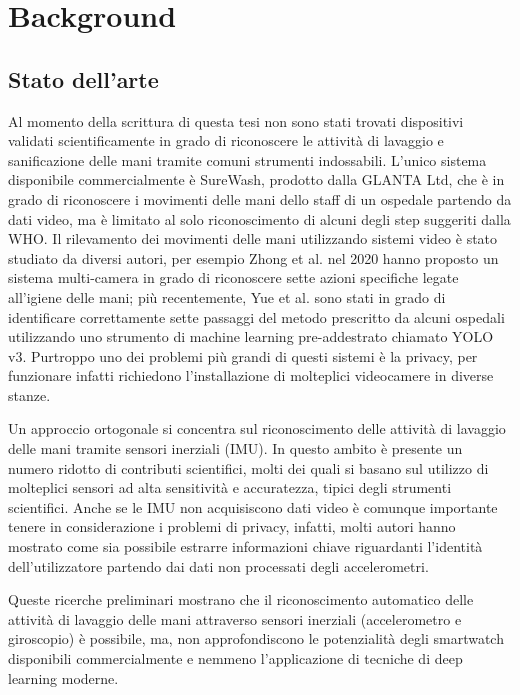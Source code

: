 \chapter{Background}
\label{cap:background}

\section{Stato dell'arte}
\label{sec:stato-dell-arte}

Al momento della scrittura di questa tesi non sono stati trovati dispositivi validati scientificamente in grado di riconoscere le attività di lavaggio e sanificazione delle mani tramite comuni strumenti indossabili. L'unico sistema disponibile commercialmente è SureWash, prodotto dalla GLANTA Ltd, che è in grado di riconoscere i movimenti delle mani dello staff di un ospedale partendo da dati video, ma è limitato al solo riconoscimento di alcuni degli step suggeriti dalla WHO.
Il rilevamento dei movimenti delle mani utilizzando sistemi video è stato studiato da diversi autori, per esempio Zhong et al. nel 2020 hanno proposto un sistema multi-camera in grado di riconoscere sette azioni specifiche legate all'igiene delle mani\cite{zhong2020multi}; più recentemente, Yue et al. sono stati in grado di identificare correttamente sette passaggi del metodo prescritto da alcuni ospedali utilizzando uno strumento di machine learning pre-addestrato chiamato YOLO v3\cite{yue2021intelligent}.
Purtroppo uno dei problemi più grandi di questi sistemi è la privacy, per funzionare infatti richiedono l'installazione di molteplici videocamere in diverse stanze.

Un approccio ortogonale si concentra sul riconoscimento delle attività di lavaggio delle mani tramite sensori inerziali (IMU). In questo ambito è presente un numero ridotto di contributi scientifici, molti dei quali si basano sul utilizzo di molteplici sensori ad alta sensitività e accuratezza, tipici degli strumenti scientifici\cite{galluzzi2015hand}\cite{bal2017system}\cite{li2018wristwash}. 
Anche se le IMU non acquisiscono dati video è comunque importante tenere in considerazione i problemi di privacy, infatti, molti autori hanno mostrato come sia possibile estrarre informazioni chiave riguardanti l'identità dell'utilizzatore partendo dai dati non processati degli accelerometri\cite{jain2018gender}\cite{van2019systematic}.

Queste ricerche preliminari mostrano che il riconoscimento automatico delle attività di lavaggio delle mani attraverso sensori inerziali (accelerometro e giroscopio) è possibile, ma, non approfondiscono le potenzialità degli smartwatch disponibili commercialmente e nemmeno l'applicazione di tecniche di deep learning moderne.

